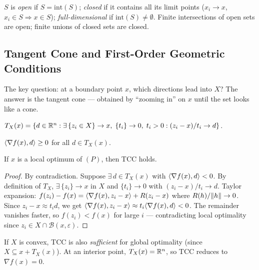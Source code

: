 \begin{defn}\label{def:set-classes}
	$S$ is \textit{open} if $S = \mathrm{int}(S)$; \textit{closed} if it contains all its limit points ($x_i \to x$, $x_i \in S \Rightarrow x \in S$); \textit{full-dimensional} if $\mathrm{int}(S) \neq \emptyset$.
	Finite intersections of open sets are open; finite unions of closed sets are closed.
\end{defn}


\subsection{Tangent Cone and First-Order Geometric Conditions}\label{ssec:tangent-cone}

The key question: at a boundary point $x$, which directions lead into $X$?
The answer is the tangent cone --- obtained by ``zooming in'' on $x$ until the set looks like a cone.

\begin{defn}\label{def:tangent-cone}
	$T_X(x) = \{d \in \mathbb{R}^n : \exists\, \{z_i \in X\} \to x,\; \{t_i\} \to 0,\; t_i > 0 : (z_i - x)/t_i \to d\}$.
\end{defn}

\begin{defn}\label{def:tcc}
	$\langle\nabla f(x), d\rangle \geq 0$ for all $d \in T_X(x)$.
\end{defn}

\begin{thm}\label{thm:tcc-necessary}
	If $x$ is a local optimum of $(P)$, then TCC holds.
\end{thm}
\begin{proof}
	By contradiction.
	Suppose $\exists\, d \in T_X(x)$ with $\langle\nabla f(x), d\rangle < 0$.
	By definition of $T_X$, $\exists\, \{z_i\} \to x$ in $X$ and $\{t_i\} \to 0$ with $(z_i - x)/t_i \to d$.
	Taylor expansion: $f(z_i) - f(x) = \langle\nabla f(x), z_i - x\rangle + R(z_i - x)$ where $R(h)/\lVert h\rVert \to 0$.
	Since $z_i - x \approx t_i d$, we get $\langle\nabla f(x), z_i - x\rangle \approx t_i \langle\nabla f(x), d\rangle < 0$.
	The remainder vanishes faster, so $f(z_i) < f(x)$ for large $i$ --- contradicting local optimality since $z_i \in X \cap \mathcal{B}(x, \varepsilon)$.
\end{proof}

If $X$ is convex, TCC is also \textit{sufficient} for global optimality (since $X \subseteq x + T_X(x)$).
At an interior point, $T_X(x) = \mathbb{R}^n$, so TCC reduces to $\nabla f(x) = 0$.

